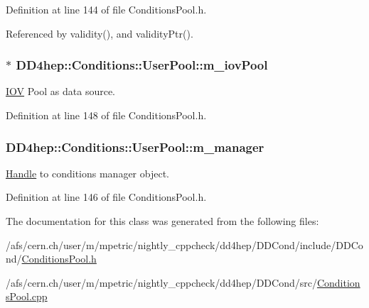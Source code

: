 Definition at line 144 of file ConditionsPool.h.

Referenced by validity(), and validityPtr().\hypertarget{class_d_d4hep_1_1_conditions_1_1_user_pool_a916051bc20a354a8c603be0bf0c54cac}{
\subsubsection[{m\_\-iovPool}]{$\ast$ {\bf DD4hep::Conditions::UserPool::m\_\-iovPool}}}
\label{class_d_d4hep_1_1_conditions_1_1_user_pool_a916051bc20a354a8c603be0bf0c54cac}


\hyperlink{class_d_d4hep_1_1_i_o_v}{IOV} Pool as data source. 

Definition at line 148 of file ConditionsPool.h.\hypertarget{class_d_d4hep_1_1_conditions_1_1_user_pool_a92b13c15de8a8982e6ff8e4f5d24566a}{
\subsubsection[{m\_\-manager}]{ {\bf DD4hep::Conditions::UserPool::m\_\-manager}}}
\label{class_d_d4hep_1_1_conditions_1_1_user_pool_a92b13c15de8a8982e6ff8e4f5d24566a}


\hyperlink{class_d_d4hep_1_1_handle}{Handle} to conditions manager object. 

Definition at line 146 of file ConditionsPool.h.

The documentation for this class was generated from the following files:\begin{DoxyCompactItemize}
\item 
/afs/cern.ch/user/m/mpetric/nightly\_\-cppcheck/dd4hep/DDCond/include/DDCond/\hyperlink{_conditions_pool_8h}{ConditionsPool.h}\item 
/afs/cern.ch/user/m/mpetric/nightly\_\-cppcheck/dd4hep/DDCond/src/\hyperlink{_conditions_pool_8cpp}{ConditionsPool.cpp}\end{DoxyCompactItemize}
